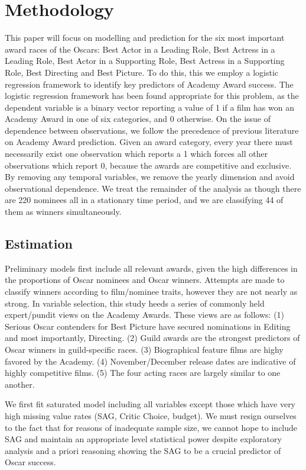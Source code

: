 \documentclass[jou,apacite]{apa6}
\begin{document}
\section{Methodology}
 This paper will focus on modelling and prediction for the six most important award races of the Oscars: Best Actor in a Leading Role, Best Actress in a Leading Role, Best  Actor in a Supporting Role, Best  Actress in a Supporting Role, Best Directing and Best Picture. 
 To do this, this we employ a logistic regression framework to identify key predictors of Academy Award success. The logistic regression framework has been found appropriate for this problem, as the dependent variable is a binary vector reporting a value of 1 if a film has won an Academy Award in one of six categories, and 0 otherwise. On the issue of dependence between observations, we follow the precedence of previous literature on Academy Award prediction. Given an award category, every year there must necessarily exist one observation which reports a 1 which forces all other observations which report 0, because the awards are competitive and exclusive. By removing any temporal variables, we remove  the yearly dimension and avoid observational dependence. We treat the remainder of the analysis as though there are 220 nominees all in a stationary time period, and we are classifying 44 of them as winners simultaneously.

\subsection{Estimation}
Preliminary models first include all relevant awards, given the high differences in the proportions of Oscar nominees and Oscar winners. Attempts are made to classify winners according to film/nominee traits, however they are not nearly as strong. In variable selection, this study heeds a series of commonly held expert/pundit views on the Academy Awards. These views are as follows: (1) Serious Oscar contenders for Best Picture have secured nominations in Editing and most importantly, Directing. (2) Guild awards are the strongest predictors of Oscar winners in guild-specific races. (3) Biographical feature films are highy favored by the Academy. (4) November/December release dates are indicative of highly competitive films. (5) The four acting races are largely similar to one another.

We first fit saturated model including all variables except those which have very high missing value rates (SAG, Critic Choice, budget). We must resign ourselves to the fact that
for reasons of inadequate sample size, we cannot hope to include SAG and maintain an appropriate level statistical power despite exploratory analysis and a priori reasoning showing the SAG to be a crucial predictor of Oscar success.
\end{document}

